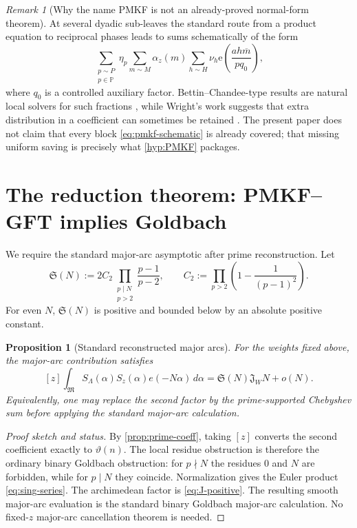 \documentclass[11pt]{article}
\newtheorem{proposition}[theorem]{Proposition}
\theoremstyle{definition}
\theoremstyle{remark}
\newtheorem{remark}[theorem]{Remark}
\newcommand{\Pp}{\mathbb P}
\newcommand{\1}{\mathbf 1}
\newcommand{\e}{\mathrm e}
\newcommand{\Mcal}{\mathfrak M}
\newcommand{\SG}{\mathfrak S}
\begin{document}
\begin{remark}[Why the name PMKF is not an already-proved normal-form theorem]
At several dyadic sub-leaves the standard route from a product equation to reciprocal phases leads to sums schematically of the form
\begin{equation}\label{eq:pmkf-schematic}
\sum_{\substack{p\sim P\\ p\in\Pp}}
\eta_p
\sum_{m\sim M}\alpha_z(m)
\sum_{h\sim H}\nu_h
\e\!\left(\frac{a h\overline m}{p q_0}\right),
\end{equation}
where $q_0$ is a controlled auxiliary factor.  Bettin--Chandee-type results are natural local solvers for such fractions \cite{BC}, while Wright's work suggests that extra distribution in a coefficient can sometimes be retained \cite{Wright}.  The present paper does not claim that every block \eqref{eq:pmkf-schematic} is already covered; that missing uniform saving is precisely what \cref{hyp:PMKF} packages.
\end{remark}

\section{The reduction theorem: PMKF--GFT implies Goldbach}\label{sec:reduction}

We require the standard major-arc asymptotic after prime reconstruction.  Let
\begin{equation}\label{eq:sing-series}
\SG(N)
:=
2C_2\prod_{\substack{p\mid N\\p>2}}\frac{p-1}{p-2},
\qquad
C_2:=\prod_{p>2}\left(1-\frac{1}{(p-1)^2}\right).
\end{equation}
For even $N$, $\SG(N)$ is positive and bounded below by an absolute positive constant.

\begin{proposition}[Standard reconstructed major arcs]\label{prop:major}
For the weights fixed above, the major-arc contribution satisfies
\begin{equation}\label{eq:major-asymptotic}
[z]\int_{\Mcal}S_\Lambda(\alpha)S_z(\alpha)e(-N\alpha)\,d\alpha
=
\SG(N)\mathfrak J_W N
+o(N).
\end{equation}
Equivalently, one may replace the second factor by the prime-supported Chebyshev sum before applying the standard major-arc calculation.
\end{proposition}

\begin{proof}[Proof sketch and status]
By \cref{prop:prime-coeff}, taking $[z]$ converts the second coefficient exactly to $\vartheta(n)$.  The local residue obstruction is therefore the ordinary binary Goldbach obstruction: for $p\nmid N$ the residues $0$ and $N$ are forbidden, while for $p\mid N$ they coincide.  Normalization gives the Euler product \eqref{eq:sing-series}.  The archimedean factor is \eqref{eq:J-positive}.  The resulting smooth major-arc evaluation is the standard binary Goldbach major-arc calculation.  No fixed-$z$ major-arc cancellation theorem is needed.
\end{proof}
\end{document}
